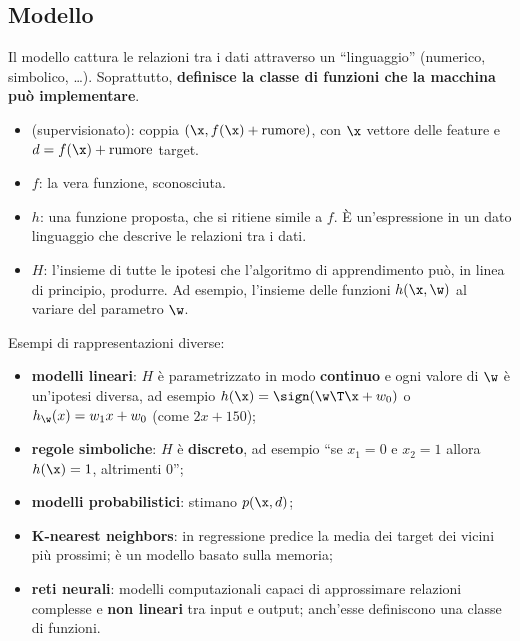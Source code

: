 \subsection{Modello}
\label{sec:modello}

Il modello cattura le relazioni tra i dati attraverso un ``linguaggio'' (numerico, simbolico, \dots). Soprattutto,
\textbf{definisce la classe di funzioni che la macchina può implementare}.

\begin{definizione}
\begin{itemize}
  \item {} (supervisionato): coppia $(\x, f(\x)+\text{rumore})$, con $\x$ vettore delle
        feature e $d = f(\x)+\text{rumore}$ target.
  \item {} $f$: la vera funzione, sconosciuta.
  \item {} $h$: una funzione proposta, che si ritiene simile a $f$. È un'espressione in un dato
        linguaggio che descrive le relazioni tra i dati.
  \item {} $H$: l'insieme di tutte le ipotesi che l'algoritmo di apprendimento può, in
        linea di principio, produrre. Ad esempio, l'insieme delle funzioni $h(\x,\w)$ al variare del parametro
        $\w$.
\end{itemize}
\end{definizione}

Esempi di rappresentazioni diverse:
\begin{itemize}
  \item \textbf{modelli lineari}: $H$ è parametrizzato in modo \textbf{continuo} e ogni valore di $\w$ è
        un'ipotesi diversa, ad esempio $h(\x) = \sign(\w\T\x+w_0)$ o $h_\w(x) = w_1x+w_0$ (come $2x+150$);
  \item \textbf{regole simboliche}: $H$ è \textbf{discreto}, ad esempio ``se $x_1=0$ e $x_2=1$ allora
        $h(\x)=1$, altrimenti $0$'';
  \item \textbf{modelli probabilistici}: stimano $p(\x,d)$;
  \item \textbf{K-nearest neighbors}: in regressione predice la media dei target dei vicini più prossimi; è un
        modello basato sulla memoria;
  \item \textbf{reti neurali}: modelli computazionali capaci di approssimare relazioni complesse e \textbf{non
        lineari} tra input e output; anch'esse definiscono una classe di funzioni.
\end{itemize}

